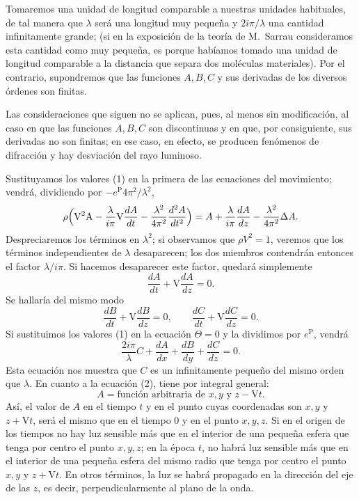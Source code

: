 Tomaremos una unidad de longitud comparable a nuestras unidades
habituales, de tal manera que $\lambda$ será una longitud muy pequeña y
$2i\pi/\lambda$ una cantidad infinitamente grande; (si en la exposición
de la teoría de M.~Sarrau consideramos esta cantidad como muy pequeña, es
porque habíamos tomado una unidad de longitud comparable a la distancia
que separa dos moléculas materiales). Por el contrario, supondremos que
las funciones $A,B,C$ y sus derivadas de los diversos órdenes son
finitas.

Las consideraciones que siguen no se aplican, pues, al menos sin
modificación, al caso en que las funciones $A,B,C$ son discontinuas y en
que, por consiguiente, sus derivadas no son finitas; en ese caso, en
efecto, se producen fenómenos de difracción y hay desviación del rayo
luminoso.

Sustituyamos los valores (1) en la primera de las ecuaciones del
movimiento; vendrá, dividiendo por $-e^{\mathrm P}4\pi^2/\lambda^2$,
\[
\rho\Bigl(\mathrm V^2\mathrm A-\frac{\lambda}{i\pi}\mathrm V\frac{dA}{dt}-\frac{\lambda^2}{4\pi^2}\frac{d^2A}{dt^2}\Bigr)
=A+\frac{\lambda}{i\pi}\frac{dA}{dz}-\frac{\lambda^2}{4\pi^2}\Delta A.
\]
Despreciaremos los términos en $\lambda^2$; si observamos que $\rho
V^2=1$, veremos que los términos independientes de $\lambda$
desaparecen; los dos miembros contendrán entonces el factor $\lambda/i\pi$.
Si hacemos desaparecer este factor, quedará simplemente
\begin{equation}
\frac{dA}{dt}+\mathrm V\frac{dA}{dz}=0.
\tag{2}
\end{equation}
Se hallaría del mismo modo
\[
\frac{dB}{dt}+\mathrm V\frac{dB}{dz}=0,\qquad
\frac{dC}{dt}+\mathrm V\frac{dC}{dz}=0.
\]
Si sustituimos los valores (1) en la ecuación $\Theta=0$ y la dividimos
por $e^{\mathrm P}$, vendrá
\[
\frac{2i\pi}{\lambda}C+\frac{dA}{dx}+\frac{dB}{dy}+\frac{dC}{dz}=0.
\]
Esta ecuación nos muestra que $C$ es un infinitamente pequeño del mismo
orden que $\lambda$. En cuanto a la ecuación (2), tiene por integral
general:
\[
A=\text{función arbitraria de }x,y\text{ y }z-\mathrm Vt.
\]
Así, el valor de $A$ en el tiempo $t$ y en el punto cuyas coordenadas son
$x,y$ y $z+\mathrm Vt$, será el mismo que en el tiempo $0$ y en el punto
$x,y,z$. Si en el origen de los tiempos no hay luz sensible más que en el
interior de una pequeña esfera que tenga por centro el punto $x,y,z$; en
la época $t$, no habrá luz sensible más que en el interior de una
pequeña esfera del mismo radio que tenga por centro el punto $x,y$ y
$z+\mathrm Vt$. En otros términos, la luz se habrá propagado en la
dirección del eje de las $z$, es decir, perpendicularmente al plano de la
onda.

